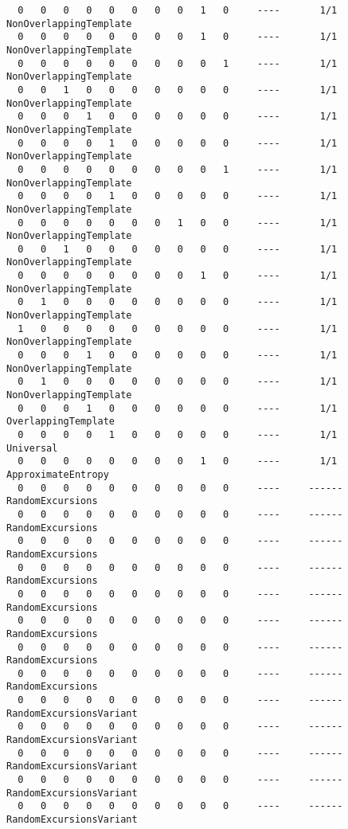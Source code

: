 \begin{code}
\begin{verbatim}
  0   0   0   0   0   0   0   0   1   0     ----       1/1       NonOverlappingTemplate
  0   0   0   0   0   0   0   0   1   0     ----       1/1       NonOverlappingTemplate
  0   0   0   0   0   0   0   0   0   1     ----       1/1       NonOverlappingTemplate
  0   0   1   0   0   0   0   0   0   0     ----       1/1       NonOverlappingTemplate
  0   0   0   1   0   0   0   0   0   0     ----       1/1       NonOverlappingTemplate
  0   0   0   0   1   0   0   0   0   0     ----       1/1       NonOverlappingTemplate
  0   0   0   0   0   0   0   0   0   1     ----       1/1       NonOverlappingTemplate
  0   0   0   0   1   0   0   0   0   0     ----       1/1       NonOverlappingTemplate
  0   0   0   0   0   0   0   1   0   0     ----       1/1       NonOverlappingTemplate
  0   0   1   0   0   0   0   0   0   0     ----       1/1       NonOverlappingTemplate
  0   0   0   0   0   0   0   0   1   0     ----       1/1       NonOverlappingTemplate
  0   1   0   0   0   0   0   0   0   0     ----       1/1       NonOverlappingTemplate
  1   0   0   0   0   0   0   0   0   0     ----       1/1       NonOverlappingTemplate
  0   0   0   1   0   0   0   0   0   0     ----       1/1       NonOverlappingTemplate
  0   1   0   0   0   0   0   0   0   0     ----       1/1       NonOverlappingTemplate
  0   0   0   1   0   0   0   0   0   0     ----       1/1       OverlappingTemplate
  0   0   0   0   1   0   0   0   0   0     ----       1/1       Universal
  0   0   0   0   0   0   0   0   1   0     ----       1/1       ApproximateEntropy
  0   0   0   0   0   0   0   0   0   0     ----     ------     RandomExcursions
  0   0   0   0   0   0   0   0   0   0     ----     ------     RandomExcursions
  0   0   0   0   0   0   0   0   0   0     ----     ------     RandomExcursions
  0   0   0   0   0   0   0   0   0   0     ----     ------     RandomExcursions
  0   0   0   0   0   0   0   0   0   0     ----     ------     RandomExcursions
  0   0   0   0   0   0   0   0   0   0     ----     ------     RandomExcursions
  0   0   0   0   0   0   0   0   0   0     ----     ------     RandomExcursions
  0   0   0   0   0   0   0   0   0   0     ----     ------     RandomExcursions
  0   0   0   0   0   0   0   0   0   0     ----     ------     RandomExcursionsVariant
  0   0   0   0   0   0   0   0   0   0     ----     ------     RandomExcursionsVariant
  0   0   0   0   0   0   0   0   0   0     ----     ------     RandomExcursionsVariant
  0   0   0   0   0   0   0   0   0   0     ----     ------     RandomExcursionsVariant
  0   0   0   0   0   0   0   0   0   0     ----     ------     RandomExcursionsVariant

\end{verbatim}
\end{code}
